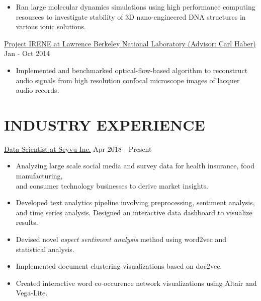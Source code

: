 \documentclass{res}
\begin{document}
\begin{resume}
\begin{itemize}
\item {\normalfont Ran large molecular dynamics simulations using high performance computing resources to investigate stability of 3D nano-engineered DNA structures in various ionic solutions.}
\end{itemize}
\href{https://irene.lbl.gov/}{Project IRENE at Lawrence Berkeley National Laboratory (Advisor: Carl Haber)}  \hfill Jan - Oct 2014\\
\begin{itemize}
\item {\normalfont Implemented and benchmarked optical-flow-based algorithm to reconstruct audio signals from high resolution confocal microscope images of lacquer audio records.}
\end{itemize}
\vspace{-7pt}
\section{INDUSTRY EXPERIENCE}
\href{https://seyvu.ai/}{Data Scientist at Seyvu Inc.}  \hfill Apr 2018 - Present \\
\begin{itemize}
\item Analyzing large scale social media and survey data for  health insurance, food manufacturing, \\and consumer technology businesses to derive market insights.
\item Developed text analytics pipeline involving preprocessing, sentiment analysis, and time series analysis. Designed an interactive data dashboard to visualize results.
\item Devised novel \emph{aspect sentiment analysis} method using word2vec and statistical analysis.
\item Implemented document clustering visualizations based on doc2vec.
\item Created interactive word co-occurence network visualizations using Altair and Vega-Lite.


\end{itemize}
\end{resume}
\end{document}
